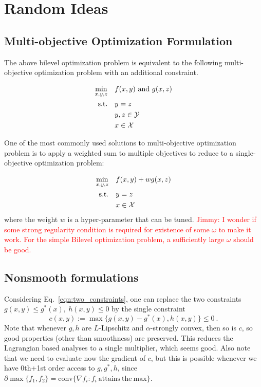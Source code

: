 \section{Random Ideas}
\subsection{Multi-objective Optimization Formulation}
The above bilevel optimization problem is equivalent to the following multi-objective optimization problem with an additional constraint.

\begin{align}
    \min_{x, y, z} & \quad f(x, y) ~ \text{and} ~ g(x, z) \\
    \text{s.t.} & \quad y = z \\ 
    & \quad y, z \in \mathcal{Y} \\
    & \quad x \in \mathcal{X}
\end{align}


One of the most commonly used solutions to multi-objective optimization problem is to apply a weighted sum to multiple objectives to reduce to a single-objective optimization problem:

\begin{align}
    \min_{x, y, z} & \quad f(x, y) + w g(x, z) \\
    \text{s.t.} & \quad y = z \\
    & \quad x \in \mathcal{X}
\end{align}
where the weight $w$ is a hyper-parameter that can be tuned.
\textcolor{red}{Jimmy: I wonder if some strong regularity condition is required for existence of some $\omega$ to make it work. For the simple Bilevel optimization problem, a sufficiently large $\omega$ should be good.}


\subsection{Nonsmooth formulations}

Considering Eq.~\ref{eqn:two_constraints}, one can replace the two constraints $g(x,y)\leq g^*(x),~h(x,y)\leq0$ by the single constraint 
\[
c(x,y):=\max\{g(x,y)-g^*(x),h(x,y)\}\leq 0~.
\]
Note that whenever $g,h$ are $L$-Lipschitz and $\alpha$-strongly convex, then so is $c$, so good properties (other than smoothness) are preserved. This reduces the Lagrangian based analyses to a single multiplier, which seems good. Also note that we need to evaluate now the gradient of $c$, but this is possible whenever we have 0th+1st order access to $g,g^*,h$, since $\partial \max\{f_1,f_2\}=\mathrm{conv}\{\nabla f_i:f_i\mathrm{~attains~the~max}\}$.



